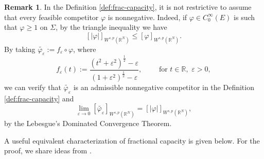 \documentclass{amsart}
\theoremstyle{definition}
\newtheorem{remark}[theorem]{Remark}
\numberwithin{equation}{section}
\begin{document}
\begin{remark} \label{rmk:defi-cap} 
	In the Definition \ref{def:frac-capacity}, it is not restrictive to assume that every feasible competitor $\varphi$ is nonnegative. Indeed, if $\varphi \in C^\infty_0(E)$ is such that $\varphi \ge 1$ on $\Sigma$, by the triangle inequality we have
	\begin{equation*}\label{ok4}
		\left[|\varphi|\right]_{W^{s,p}(\mathbb{R}^N)} \le [\varphi]_{W^{s,p}(\mathbb{R}^N)}.
	\end{equation*}
	By taking  $\widetilde{\varphi_\varepsilon} := f_\varepsilon \circ \varphi$, where
	\[
	f_\varepsilon(t) := \frac{\left(t^2 + \varepsilon^2\right)^\frac{1}{2} - \varepsilon}{\left(1 + \varepsilon^2\right)^{\frac{1}{2}} - \varepsilon}, \qquad \mbox{ for } t \in \mathbb{R},\,\, \varepsilon > 0,
	\] 
	we can verify that $\widetilde{\varphi_{\varepsilon}}$ is an admissible nonnegative competitor in the Definition \ref{def:frac-capacity} and 
	\begin{equation*} \label{admissible-1}
		\lim_{\varepsilon \to 0} [\widetilde{\varphi_\varepsilon}]_{W^{s,p}(\mathbb{R}^N)} = [|\varphi|]_{W^{s,p}(\mathbb{R}^N)},
	\end{equation*}
	by the Lebesgue's Dominated Convergence Theorem.
\end{remark}

A useful equivalent characterization of fractional capacity is given below. For the proof, we share ideas from \cite[Remark 1.4.2]{tesi-francesca}. 
\end{document}

